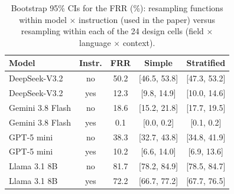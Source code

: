 \begin{table}[H]
\caption{Bootstrap 95\% CIs for the FRR (\%): resampling functions within model $\times$ instruction (used in the paper) versus resampling within each of the 24 design cells (field $\times$ language $\times$ context).\label{tab:bootstrap}}
\begin{tabularx}{\textwidth}{lcCCC}
\toprule
\textbf{Model} & \textbf{Instr.} & \textbf{FRR} & \textbf{Simple} & \textbf{Stratified}\\
\midrule
DeepSeek-V3.2 & no & 50.2 & [46.5, 53.8] & [47.3, 53.2]\\
DeepSeek-V3.2 & yes & 12.3 & [9.8, 14.9] & [10.0, 14.6]\\
Gemini 3.8 Flash & no & 18.6 & [15.2, 21.8] & [17.7, 19.5]\\
Gemini 3.8 Flash & yes & 0.1 & [0.0, 0.2] & [0.1, 0.2]\\
GPT-5 mini & no & 38.3 & [32.7, 43.8] & [34.8, 41.9]\\
GPT-5 mini & yes & 10.2 & [6.6, 14.0] & [6.9, 13.6]\\
Llama 3.1 8B & no & 81.7 & [78.2, 84.9] & [78.5, 84.7]\\
Llama 3.1 8B & yes & 72.2 & [66.7, 77.2] & [67.7, 76.5]\\
\bottomrule
\end{tabularx}
\end{table}
